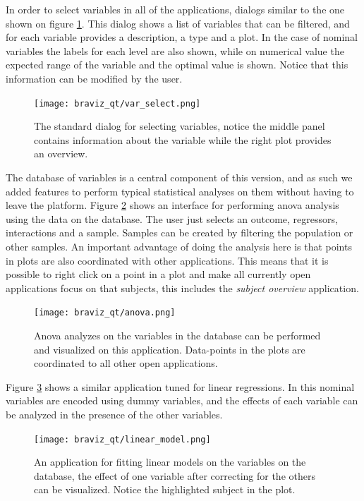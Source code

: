 In order to select variables in all of the applications, dialogs similar to the one shown on figure \ref{fig_var_select}. This dialog shows a list of variables that can be filtered, and for each variable provides a description, a type and a plot. In the case of nominal variables the labels for each level are also shown, while on numerical value the expected range of the variable and the optimal value is shown. Notice that this information can be modified by the user. 

\begin{figure}
\centering
\texttt{[image: braviz\_qt/var\_select.png]} 
\caption{\label{fig_var_select}The standard dialog for selecting variables, notice the middle panel contains information about the variable while the right plot provides an overview.}
\end{figure}

The database of variables is a central component of this version, and as such we added features to perform typical statistical analyses on them without having to leave the platform. Figure \ref{fig_anova_2} shows an interface for performing anova  analysis using the data on the database. The user just selects an outcome, regressors, interactions and a sample. Samples can be created by filtering the population or other samples. An important advantage of doing the analysis here is that points in plots are also coordinated with other applications. This means that it is possible to right click on a point in a plot and make all currently open applications focus on that subjects, this includes the \emph{subject overview} application.

\begin{figure}
\centering
\texttt{[image: braviz\_qt/anova.png]} 
\caption{\label{fig_anova_2}Anova analyzes on the variables in the database can be performed and visualized on this application. Data-points in the plots are coordinated to all other open applications.}
\end{figure}

Figure \ref{fig_lm_2} shows a similar application tuned for linear regressions. In this nominal variables are encoded using dummy variables, and the effects of each variable can be analyzed in the presence of the other variables. 

\begin{figure}
\centering
\texttt{[image: braviz\_qt/linear\_model.png]} 
\caption{\label{fig_lm_2}An application for fitting linear models on the variables on the database, the effect of one variable after correcting for the others can be visualized. Notice the highlighted subject in the plot.}
\end{figure}


